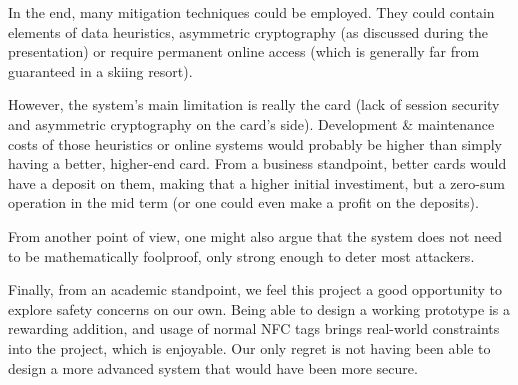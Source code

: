 \documentclass[paper=a4, fontsize=11pt]{scrartcl}
\begin{document}
In the end, many mitigation techniques could be employed.
They could contain elements of data heuristics, asymmetric cryptography (as
discussed during the presentation) or require permanent online access (which
is generally far from guaranteed in a skiing resort).

However, the system's main limitation is really the card (lack of session
security and asymmetric cryptography on the card's side).
Development \& maintenance costs of those heuristics or online systems
would probably be higher than simply having a better, higher-end card.
From a business standpoint, better cards would have a deposit on them, making
that a higher initial investiment, but a zero-sum operation in the mid term (or
one could even make a profit on the deposits).

From another point of view, one might also argue that the system does not need
to be mathematically foolproof, only strong enough to deter most attackers.

Finally, from an academic standpoint, we feel this project a good opportunity to
explore safety concerns on our own.
Being able to design a working prototype is a rewarding addition, and usage of
normal NFC tags brings real-world constraints into the project, which is
enjoyable.
Our only regret is not having been able to design a more advanced system that
would have been more secure.
\end{document}
